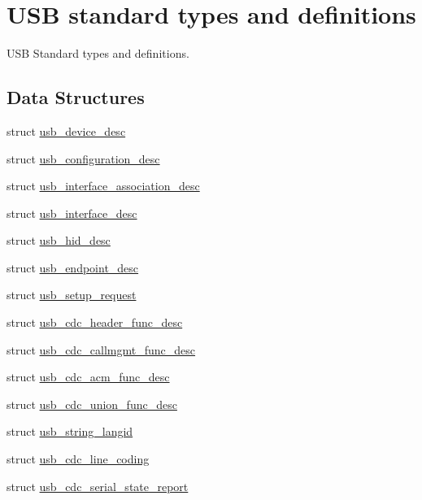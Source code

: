 \hypertarget{group___p_i_o_s___u_s_b___d_e_f_s}{\section{U\-S\-B standard types and definitions}
\label{group___p_i_o_s___u_s_b___d_e_f_s}
}


U\-S\-B Standard types and definitions.  


\subsection*{Data Structures}
\begin{DoxyCompactItemize}
\item 
struct \hyperlink{structusb__device__desc}{usb\-\_\-device\-\_\-desc}
\item 
struct \hyperlink{structusb__configuration__desc}{usb\-\_\-configuration\-\_\-desc}
\item 
struct \hyperlink{structusb__interface__association__desc}{usb\-\_\-interface\-\_\-association\-\_\-desc}
\item 
struct \hyperlink{structusb__interface__desc}{usb\-\_\-interface\-\_\-desc}
\item 
struct \hyperlink{structusb__hid__desc}{usb\-\_\-hid\-\_\-desc}
\item 
struct \hyperlink{structusb__endpoint__desc}{usb\-\_\-endpoint\-\_\-desc}
\item 
struct \hyperlink{structusb__setup__request}{usb\-\_\-setup\-\_\-request}
\item 
struct \hyperlink{structusb__cdc__header__func__desc}{usb\-\_\-cdc\-\_\-header\-\_\-func\-\_\-desc}
\item 
struct \hyperlink{structusb__cdc__callmgmt__func__desc}{usb\-\_\-cdc\-\_\-callmgmt\-\_\-func\-\_\-desc}
\item 
struct \hyperlink{structusb__cdc__acm__func__desc}{usb\-\_\-cdc\-\_\-acm\-\_\-func\-\_\-desc}
\item 
struct \hyperlink{structusb__cdc__union__func__desc}{usb\-\_\-cdc\-\_\-union\-\_\-func\-\_\-desc}
\item 
struct \hyperlink{structusb__string__langid}{usb\-\_\-string\-\_\-langid}
\item 
struct \hyperlink{structusb__cdc__line__coding}{usb\-\_\-cdc\-\_\-line\-\_\-coding}
\item 
struct \hyperlink{structusb__cdc__serial__state__report}{usb\-\_\-cdc\-\_\-serial\-\_\-state\-\_\-report}
\end{DoxyCompactItemize}
